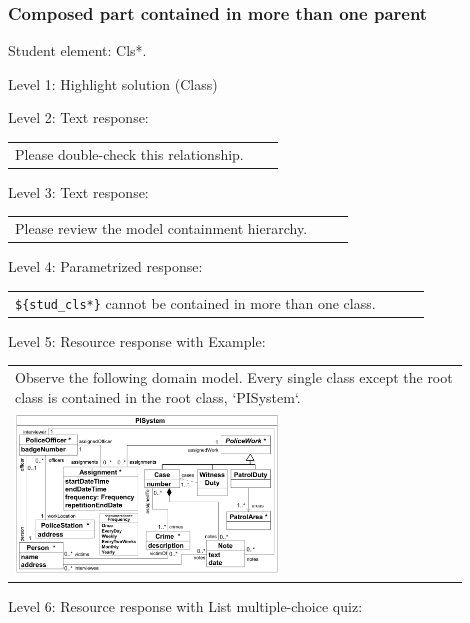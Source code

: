 \subsubsection{Composed part contained in more than one parent}

Student element: Cls*.  \medskip

\noindent Level 1: Highlight solution (Class) \medskip

\noindent Level 2: Text response: \medskip

\begin{tabular}{|p{0.9\linewidth}}
Please double-check this relationship.
\end{tabular} \medskip

\noindent Level 3: Text response: \medskip

\begin{tabular}{|p{0.9\linewidth}}
Please review the model containment hierarchy.
\end{tabular} \medskip

\noindent Level 4: Parametrized response: \medskip

\begin{tabular}{|p{0.9\linewidth}}
\verb|${stud_cls*}| cannot be contained in more than one class.
\end{tabular} \medskip

\noindent Level 5: Resource response with Example: \medskip

\begin{tabular}{|p{0.9\linewidth}}
Observe the following domain model. Every single class except the root class is contained in the 
root class, `PISystem`.

\\
\includegraphics[width=0.6\textwidth]{images/PISystem.png}
\end{tabular} \medskip

\noindent Level 6: Resource response with List multiple-choice quiz: \medskip

